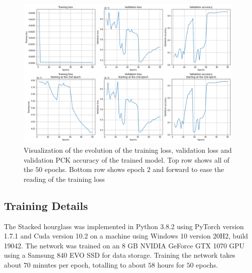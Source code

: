 \documentclass[./main.tex]{subfiles}
\begin{document}
\begin{figure}[t]
    \centering
    \includegraphics[width = \textwidth]{entities/results.png}
    \caption{Visualization of the evolution of the training loss, validation loss and validation PCK accuracy of the trained model. Top row shows all of the $50$ epochs. Bottom row shows epoch $2$ and forward to ease the reading of the training loss}
    \label{fig:results}
\end{figure}

\subsection{Training Details}\label{subsec:training_details}
The Stacked hourglass was implemented in Python 3.8.2 using PyTorch version 1.7.1 and Cuda version 10.2 on a machine using Windows 10 version 20H2, build 19042. The network was trained on an 8 GB NVIDIA GeForce GTX 1070 GPU using a Samsung 840 EVO SSD for data storage. Training the network takes about $70$ minutes per epoch, totalling to about $58$ hours for $50$ epochs.
\end{document}
